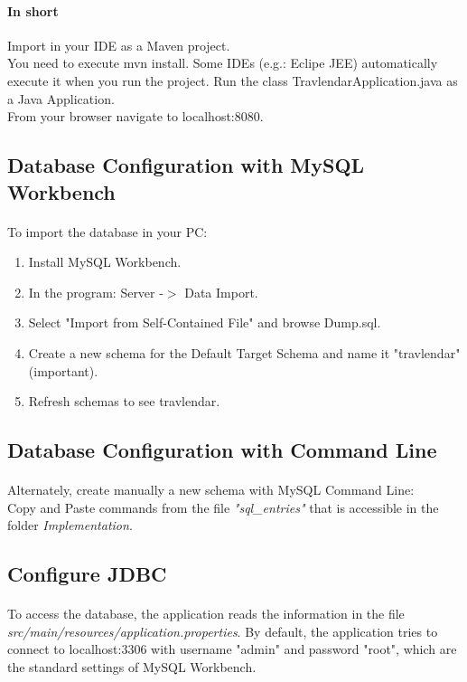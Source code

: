 \documentclass{article}
\begin{document}
		\paragraph{In short\\}Import in your IDE as a Maven project. \\You need to execute mvn install. Some IDEs (e.g.: Eclipe JEE) automatically execute it when you run the project.
Run the class TravlendarApplication.java as a Java Application.\\From your browser navigate to localhost:8080.
		\subsection{Database Configuration with MySQL Workbench}
		\paragraph{}To import the database in your PC:
		\begin{enumerate}
			\item Install MySQL Workbench.
			\item In the program: Server -$>$ Data Import.
			\item Select "Import from Self-Contained File" and browse Dump.sql.
			\item Create a new schema for the Default Target Schema and name it "travlendar" (important).
			\item Refresh schemas to see travlendar.
		\end{enumerate}
		\subsection{Database Configuration with Command Line}
		\paragraph{}Alternately, create manually a new schema with MySQL Command Line:\\Copy and Paste commands from the file \textit{"sql\_entries"} that is accessible in the folder \textit{Implementation}.
		\subsection{Configure JDBC}
		\paragraph{}To access the database, the application reads the information in the file \textit{src/main/resources/application.properties}. By default, the application tries to connect to localhost:3306 with username "admin" and password "root", which are the standard settings of MySQL Workbench.
\end{document}
